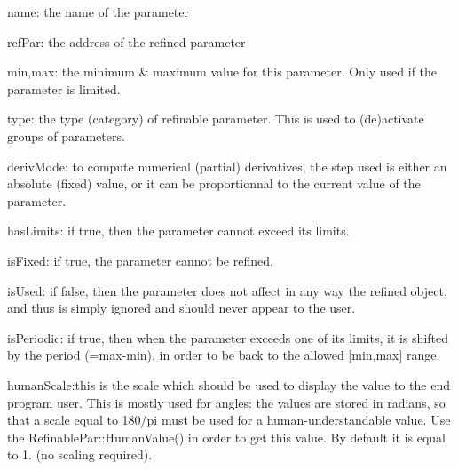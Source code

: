 \begin{DoxyParagraph}{name\+: the name of the parameter}

\end{DoxyParagraph}
\begin{DoxyParagraph}{ref\+Par\+: the address of the refined parameter}

\end{DoxyParagraph}
\begin{DoxyParagraph}{min,max\+: the minimum \& maximum value for this parameter. Only used}
if the parameter is limited. 
\end{DoxyParagraph}
\begin{DoxyParagraph}{type\+: the type (category) of refinable parameter. This is used to (de)activate}
groups of parameters. 
\end{DoxyParagraph}
\begin{DoxyParagraph}{deriv\+Mode\+: to compute numerical (partial) derivatives, the step used is either}
an absolute (fixed) value, or it can be proportionnal to the current value of the parameter. 
\end{DoxyParagraph}
\begin{DoxyParagraph}{has\+Limits\+: if true, then the parameter cannot exceed its limits.}

\end{DoxyParagraph}
\begin{DoxyParagraph}{is\+Fixed\+: if true, the parameter cannot be refined.}

\end{DoxyParagraph}
\begin{DoxyParagraph}{is\+Used\+: if false, then the parameter does not affect in any way the refined object,}
and thus is simply ignored and should never appear to the user. 
\end{DoxyParagraph}
\begin{DoxyParagraph}{is\+Periodic\+: if true, then when the parameter exceeds one of its limits, it is}
shifted by the period (=max-\/min), in order to be back to the allowed \mbox{[}min,max\mbox{]} range. 
\end{DoxyParagraph}
\begin{DoxyParagraph}{human\+Scale\+:this is the scale which should be used to display the value to the}
end program user. This is mostly used for angles\+: the values are stored in radians, so that a scale equal to 180/pi must be used for a \textquotesingle{}human-\/understandable\textquotesingle{} value. Use the Refinable\+Par\+::\+Human\+Value() in order to get this value. By default it is equal to 1. (no scaling required). 
\end{DoxyParagraph}
\mbox{\label{class_obj_cryst_1_1_refinable_par_a99cdc4550c46d90daf63b7f2e6d8d3c3}} 
